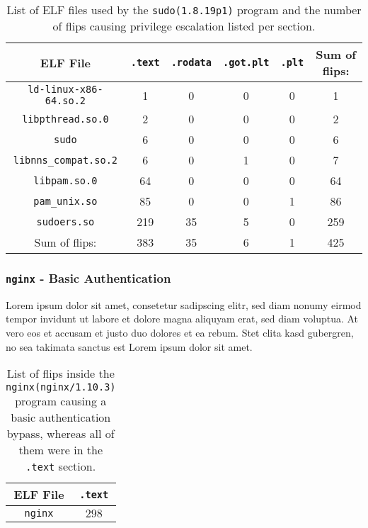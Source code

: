 \begin{table}[]
\begin{tabular}{c|cccc|c}
ELF File & \texttt{.text}  & \texttt{.rodata} & \texttt{.got.plt} &
\texttt{.plt} & Sum of flips:                             \\ \hline
\texttt{ld-linux-x86-64.so.2} & 1   & 0  & 0  & 0  & 1    \\
\texttt{libpthread.so.0}      & 2   & 0  & 0  & 0  & 2    \\
\texttt{sudo}                 & 6   & 0  & 0  & 0  & 6    \\
\texttt{libnns\_compat.so.2}  & 6   & 0  & 1  & 0  & 7    \\
\texttt{libpam.so.0}          & 64  & 0  & 0  & 0  & 64   \\
\texttt{pam\_unix.so}         & 85  & 0  & 0  & 1  & 86   \\
\texttt{sudoers.so}           & 219 & 35 & 5  & 0  & 259  \\ \hline
Sum of flips:                 & 383 & 35 & 6  & 1  & 425
\end{tabular}
\caption{List of ELF files used by the \texttt{sudo(1.8.19p1)} program and the
number of flips causing privilege escalation listed per section.}
\label{tab:sudores}
\end{table}

\subsubsection{\texttt{nginx} - Basic Authentication}

Lorem ipsum dolor sit amet, consetetur sadipscing elitr, sed diam nonumy eirmod
tempor invidunt ut labore et dolore magna aliquyam erat, sed diam voluptua. At
vero eos et accusam et justo duo dolores et ea rebum. Stet clita kasd gubergren,
no sea takimata sanctus est Lorem ipsum dolor sit amet.

\begin{table}[]
\centering
\begin{tabular}{c|c}
ELF File               & \texttt{.text} \\ \hline
\texttt{nginx}         & $298$
\end{tabular}
\caption{List of flips inside the \texttt{nginx(nginx/1.10.3)} program causing a
basic authentication bypass, whereas all of them were in the \texttt{.text}
section.}
\label{tab:nginxres}
\end{table}


